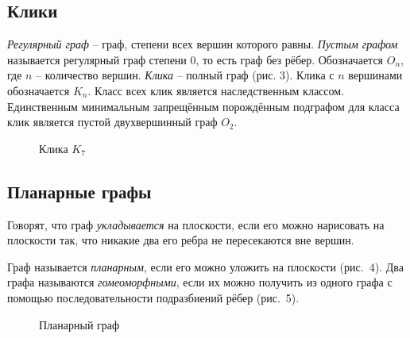 \documentclass[12pt]{article}
\begin{document}
\vspace{-5mm}

\subsection{Клики }
{\it Регулярный граф} -- граф, степени всех вершин которого равны. {\it Пустым графом} называется регулярный граф степени 0, то есть граф без рёбер. Обозначается $O_n$, где $n$ -- количество вершин.
{\it Клика } -- полный граф (рис. 3). Клика с $n$ вершинами обозначается $K_n$. Класс всех клик является наследственным классом. Единственным минимальным запрещённым порождённым подграфом для класса клик является пустой двухвершинный граф $O_2$.
\\

\begin{figure}
	\label{pic3}
	\caption{Клика $K_7$}
\end{figure}

\vspace{-5mm}

\subsection{Планарные графы }
Говорят, что граф {\it укладывается} на плоскости, если его можно нарисовать на плоскости так, что никакие два его ребра не пересекаются вне вершин.

Граф называется {\it планарным}, если его можно уложить на плоскости (рис.~4).
Два графа называются {\it гомеоморфными}, если их можно получить из одного графа с помощью последовательности подразбиений рёбер (рис.~5).

\begin{figure}
	\label{pic4}
	\caption{Планарный граф}
\end{figure}
\end{document}
